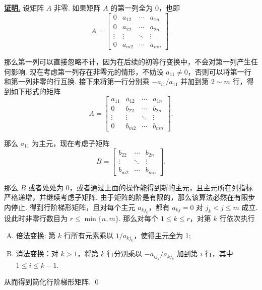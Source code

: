 \documentclass[10pt,openany]{article}
\theoremstyle{thmstyle} %
\theoremstyle{defstyle} %
\theoremstyle{prostyle} %
\renewenvironment{proof}[1][证明]{\par\underline{\textbf{#1.}} \;\fangsong}{\qed\par}
\begin{document}
\begin{proof}
	设矩阵 \( A \) 非零. 如果矩阵 \( A \) 的第一列全为 0，也即
	\[ A=\begin{bmatrix}
		0 & a_{12} & \cdots & a_{1n} \\
		0 & a_{22} & \cdots & a_{2n} \\
		\vdots & \vdots & \ddots & \vdots \\
		0 & a_{m2} & \cdots & a_{mn}
	\end{bmatrix}. \]
	
	那么第一列可以直接忽略不计，因为在后续的初等行变换中，不会对第一列产生任何影响. 现在考虑第一列存在非零元的情形，不妨设 \( a_{11} \neq 0 \)，否则可以将第一行和第一列非零的行互换. 接下来将第一行分别乘 \( -a_{i1}/a_{11} \) 并加到第 \( 2 \sim m \) 行，得到如下形式的矩阵
	\[ A=\begin{bmatrix}
		a_{11} & a_{12} & \cdots & a_{1n} \\
		0 & b_{22} & \cdots & b_{2n} \\
		\vdots & \vdots & \ddots & \vdots \\
		0 & b_{m2} & \cdots & b_{mn}
	\end{bmatrix}. \] 
	
	那么 \( a_{11} \) 为主元，现在考虑子矩阵
	\[ B=\begin{bmatrix}
		 b_{22} & \cdots & b_{2n} \\
		 \vdots & \ddots & \vdots \\
		 b_{m2} & \cdots & b_{mn}
	\end{bmatrix}. \]
	
	那么 \( B \) 或者处处为 0，或者通过上面的操作能得到新的主元，且主元所在列指标严格递增，并继续考虑子矩阵. 由于矩阵的阶是有限的，那么该算法必然在有限步内停止. 得到行阶梯形矩阵，且对每个主元 \( a_{kj_k} \)，都有 \( a_{kj}=0 \) 对 \( j_k<j \leq m  \) 成立. 设此时非零行数目为 \(  r \leq \min\{ n,m \} \). 那么对每个 \( 1 \leq k \leq r \)，对第 \( k \) 行依次执行
	\begin{enumerate}[(A)]
		\item 倍法变换: 第 \( k \) 行所有元素乘以 \( 1/a_{kj_k} \)，使得主元全为 1;
		\item 消法变换：对 \( k>1 \)，将第 \( k \) 行分别乘以 \( -a_{ij_k}/a_{kj_k} \) 加到第 \( i \) 行，其中 \( 1 \leq i \leq k-1 \).
	\end{enumerate}
	
	从而得到简化行阶梯形矩阵.
\end{proof}

\vspace{2ex}
\end{document}
